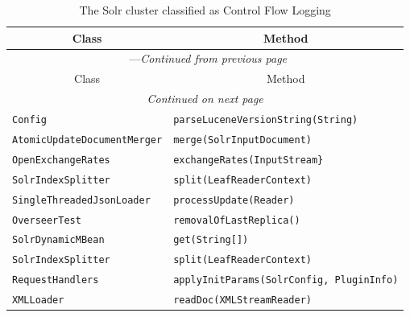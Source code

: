 \begin{center}
\begin{longtable}{ll}
\caption{The Solr cluster classified as Control Flow Logging}\\
\toprule\multicolumn{1}{c}{Class}&\multicolumn{1}{c}{Method}\\\midrule
\endfirsthead

\multicolumn{2}{c}{\tablename\ \thetable{}---\textit{Continued from previous page}} \\\midrule
\multicolumn{1}{c}{Class}&\multicolumn{1}{c}{Method}\\\midrule
\endhead
\multicolumn{2}{c}{\textit{Continued on next page}}\\\midrule
\endfoot
\bottomrule
\endlastfoot

\lstinline/Config/&{\lstinline/parseLuceneVersionString(String)/}\\
\lstinline/AtomicUpdateDocumentMerger/&{\lstinline/merge(SolrInputDocument)/}\\
\lstinline/OpenExchangeRates/&{\lstinline/exchangeRates(InputStream}/}\\
\lstinline/SolrIndexSplitter/&{\lstinline/split(LeafReaderContext)/}\\
\lstinline/SingleThreadedJsonLoader/&{\lstinline/processUpdate(Reader)/}\\
\lstinline/OverseerTest/&{\lstinline/removalOfLastReplica()/}\\
\lstinline/SolrDynamicMBean/&{\lstinline/get(String[])/}\\
\lstinline/SolrIndexSplitter/&{\lstinline/split(LeafReaderContext)/}\\
\lstinline/RequestHandlers/&{\lstinline/applyInitParams(SolrConfig, PluginInfo)/}\\
\lstinline/XMLLoader/&{\lstinline/readDoc(XMLStreamReader)/}\\
\end{longtable}
\end{center}

